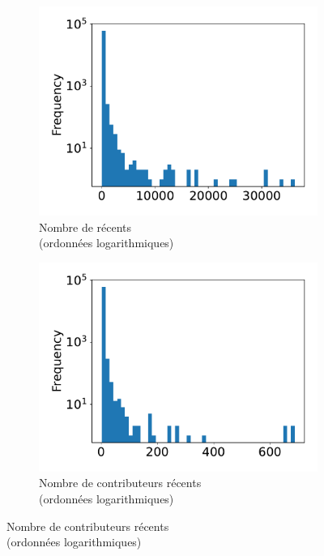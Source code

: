 \begin{figure}[ht]
    \begin{subfigure}[t]{0.3\textwidth}
        \includegraphics[width=\textwidth]{experiment/data_analysis/recentCommitCount_distribution}
        \caption{Nombre de  récents\\(ordonnées logarithmiques)}
    \end{subfigure}
    \begin{subfigure}[t]{0.3\textwidth}
        \includegraphics[width=\textwidth]{experiment/data_analysis/recentContributorCount_distribution}
        \caption{Nombre de contributeurs récents\\(ordonnées logarithmiques)}
    \end{subfigure}%

\end{figure}
